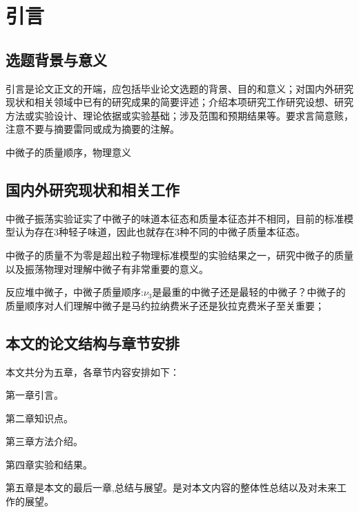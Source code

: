 
\chapter{引言}
\label{cha:introduction}
\section{选题背景与意义}
\label{sec:background}
引言是论文正文的开端，应包括毕业论文选题的背景、目的和意义；对国内外研究现状和相关领域中已有的研究成果的简要评述；介绍本项研究工作研究设想、研究方法或实验设计、理论依据或实验基础；涉及范围和预期结果等。要求言简意赅，注意不要与摘要雷同或成为摘要的注解。

中微子的质量顺序，物理意义
\section{国内外研究现状和相关工作}
\label{sec:related_work}
中微子振荡实验证实了中微子的味道本征态和质量本征态并不相同，目前的标准模型认为存在3种轻子味道，因此也就存在3种不同的中微子质量本征态。

中微子的质量不为零是超出粒子物理标准模型的实验结果之一，研究中微子的质量以及振荡物理对理解中微子有非常重要的意义。

反应堆中微子，中微子质量顺序:$\nu_{3}$是最重的中微子还是最轻的中微子？中微子的质量顺序对人们理解中微子是马约拉纳费米子还是狄拉克费米子至关重要；

\section{本文的论文结构与章节安排}

\label{sec:arrangement}
本文共分为五章，各章节内容安排如下：

第一章引言。

第二章知识点。

第三章方法介绍。

第四章实验和结果。

第五章是本文的最后一章,总结与展望。是对本文内容的整体性总结以及对未来工作的展望。

